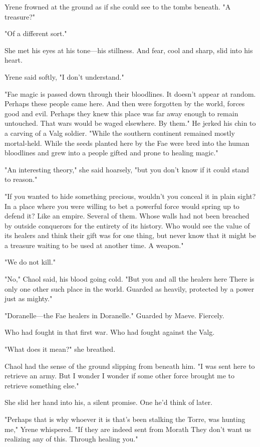 Yrene frowned at the ground as if she could see to the tombs beneath. "A treasure?"

"Of a different sort."

She met his eyes at his tone---his stillness. And fear, cool and sharp, slid into his heart.

Yrene said softly, "I don't understand."

"Fae magic is passed down through their bloodlines. It doesn't appear at random. Perhaps these people came here. And then were forgotten by the world, forces good and evil. Perhaps they knew this place was far away enough to remain untouched. That wars would be waged elsewhere. By them." He jerked his chin to a carving of a Valg soldier. "While the southern continent remained mostly mortal-held. While the seeds planted here by the Fae were bred into the human bloodlines and grew into a people gifted and prone to healing magic."

"An interesting theory," she said hoarsely, "but you don't know if it could stand to reason."

"If you wanted to hide something precious, wouldn't you conceal it in plain sight? In a place where you were willing to bet a powerful force would spring up to defend it? Like an empire. Several of them. Whose walls had not been breached by outside conquerors for the entirety of its history. Who would see the value of its healers and think their gift was for one thing, but never know that it might be a treasure waiting to be used at another time. A weapon."

"We do not kill."

"No," Chaol said, his blood going cold. "But you and all the healers here  There is only one other such place in the world. Guarded as heavily, protected by a power just as mighty."

"Doranelle---the Fae healers in Doranelle." Guarded by Maeve. Fiercely.

Who had fought in that first war. Who had fought against the Valg.

"What does it mean?" she breathed.

Chaol had the sense of the ground slipping from beneath him. "I was sent here to retrieve an army. But I wonder  I wonder if some other force brought me to retrieve something else."

She slid her hand into his, a silent promise. One he'd think of later.

"Perhaps that is why whoever it is that's been stalking the Torre, was hunting me," Yrene whispered. "If they are indeed sent from Morath
 They don't want us realizing any of this. Through healing you."

